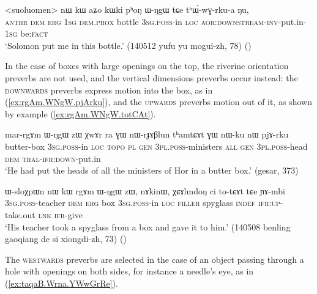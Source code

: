 \begin{exe}
\ex \label{ex:phoN.WNgW.thWwGrkua}
\gll  <suoluomen> nɯ kɯ aʑo kɯki pʰoŋ ɯ-ŋgɯ tɕe tʰɯ́-wɣ-rku-a ŋu,\\
\textsc{anthr} \textsc{dem} \textsc{erg} \textsc{1sg} \textsc{dem}.\textsc{prox} bottle \textsc{3sg}.\textsc{poss}-in \textsc{loc} \textsc{aor}:\textsc{downstream}-\textsc{inv}-put.in-\textsc{1sg} be:\textsc{fact} \\
\glt `Solomon put me in this bottle.' (140512 yufu yu mogui-zh, 78)
()
\end{exe}

In the case of boxes with large openings on the top, the riverine orientation preverbs are not used, and the vertical dimensions preverbs occur instead: the \textsc{downwards} preverbs express motion into the box, as in (\ref{ex:rgAm.WNgW.pjArku}), and the \textsc{upwards} preverbs motion out of it, as shown by example (\ref{ex:rgAm.WNgW.totCAt}).

\begin{exe}
\ex \label{ex:rgAm.WNgW.pjArku}
\gll mar-rgɤm ɯ-ŋgɯ zɯ χwɤr ra ɣɯ nɯ-rɟɤβlun tʰamtɕɤt ɣɯ nɯ-ku nɯ pjɤ-rku \\
butter-box \textsc{3sg}.\textsc{poss}-in \textsc{loc}  \textsc{topo} \textsc{pl} \textsc{gen} \textsc{3pl}.\textsc{poss}-ministers \textsc{all} \textsc{gen} \textsc{3pl}.\textsc{poss}-head \textsc{dem} \textsc{tral}-\textsc{ifr}:\textsc{down}-put.in \\
\glt `He had put the heads of all the ministers of Hor in a butter box.' (gesar, 373)
\end{exe}

\begin{exe}
\ex \label{ex:rgAm.WNgW.totCAt}
\gll ɯ-sloχpɯn nɯ kɯ rgɤm ɯ-ŋgɯ zɯ, nɤkinɯ, χɕɤlmdoŋ ci to-tɕɤt tɕe ɲɤ-mbi \\
\textsc{3sg}.\textsc{poss}-teacher \textsc{dem} \textsc{erg} box \textsc{3sg}.\textsc{poss}-in \textsc{loc} \textsc{filler} spyglass \textsc{indef} \textsc{ifr}:\textsc{up}-take.out \textsc{lnk} \textsc{ifr}-give \\
\glt `His teacher took a spyglass from a box and gave it to him.' (140508 benling gaoqiang de si xiongdi-zh, 73)
()
\end{exe}

The \textsc{westwards} preverbs are selected in the case of an object passing through a hole with openings on both sides, for instance a needle's eye, as in (\ref{ex:taqaB.Wrna.YWwGrRe}).

